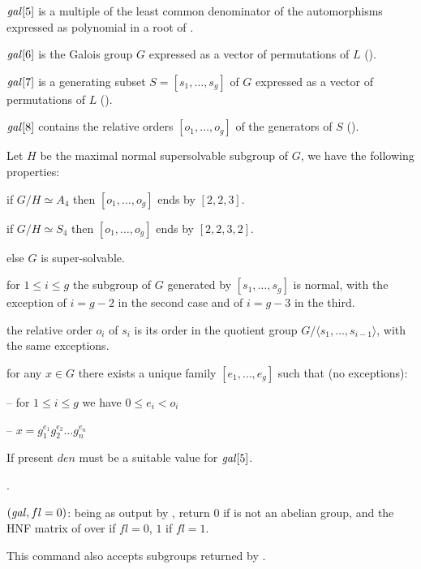 $\hbox{\it gal\/}[5]$ is a multiple of the least common denominator of the
 automorphisms expressed as polynomial in a root of .

 $\hbox{\it gal\/}[6]$ is the Galois group $G$ expressed as a vector of
 permutations of $L$ ().

 $\hbox{\it gal\/}[7]$ is a generating subset $S=[s_1,\ldots,s_g]$ of $G$
 expressed as a vector of permutations of $L$ ().

 $\hbox{\it gal\/}[8]$ contains the relative orders $[o_1,\ldots,o_g]$ of
 the generators of $S$ ().

Let $H$ be the maximal normal supersolvable subgroup of $G$, we have the
following properties:

\quad\item if $G/H\simeq A_4$ then $[o_1,\ldots,o_g]$ ends by
$[2,2,3]$.

\quad\item if $G/H\simeq S_4$ then $[o_1,\ldots,o_g]$ ends by
$[2,2,3,2]$.

\quad\item else $G$ is super-solvable.

\quad\item for $1\leq i \leq g$ the subgroup of $G$ generated by
$[s_1,\ldots,s_g]$ is normal, with the exception of $i=g-2$ in the
second case and of $i=g-3$ in the third.

\quad\item the relative order $o_i$ of $s_i$ is its order in the
quotient group $G/\langle s_1,\ldots,s_{i-1}\rangle$, with the same
exceptions.

\quad\item for any $x\in G$ there exists a unique family
$[e_1,\ldots,e_g]$ such that (no exceptions):

-- for $1\leq i \leq g$ we have $0\leq e_i<o_i$

-- $x=g_1^{e_1}g_2^{e_2}\ldots g_n^{e_n}$

If present $den$ must be a suitable value for $\hbox{\it gal\/}[5]$.

.

$(\hbox{\it gal\/},{fl=0})$:  being as output by , return $0$ if
  is not an abelian group, and the HNF matrix of  over  if $fl=0$, $1$ if
 $fl=1$.

This command also accepts subgroups returned by .

